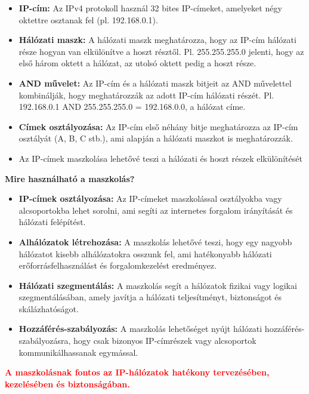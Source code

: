 \documentclass[11pt,a4paper]{article}
\begin{document}
            \begin{tcolorbox}[colback=blue!5!white,colframe=blue!50!black,title= 42. Ismertesse az internetes címek maszkolási algoritmusát!]
                \begin{itemize}
                    \item \textbf{IP-cím:} Az IPv4 protokoll használ 32 bites IP-címeket, amelyeket négy oktettre osztanak fel (pl. 192.168.0.1).
                    \item \textbf{Hálózati maszk:} A hálózati maszk meghatározza, hogy az IP-cím hálózati része hogyan van elkülönítve a hoszt résztől. Pl. 255.255.255.0 jelenti, hogy az első három oktett a hálózat, az utolsó oktett pedig a hoszt része.
                    \item \textbf{AND művelet:} Az IP-cím és a hálózati maszk bitjeit az AND művelettel kombinálják, hogy meghatározzák az adott IP-cím hálózati részét. Pl. 192.168.0.1 AND 255.255.255.0 = 192.168.0.0, a hálózat címe.
                    \item \textbf{Címek osztályozása:} Az IP-cím első néhány bitje meghatározza az IP-cím osztályát (A, B, C stb.), ami alapján a hálózati maszkot is meghatározzák.
                    \item Az IP-címek maszkolása lehetővé teszi a hálózati és hoszt részek elkülönítését 
                \end{itemize}    
                \textbf{Mire használható a maszkolás?}
                \begin{itemize}
                    \item \textbf{IP-címek osztályozása:} Az IP-címeket maszkolással osztályokba vagy alcsoportokba lehet sorolni, ami segíti az internetes forgalom irányítását és hálózati felépítést.
                    \item \textbf{Alhálózatok létrehozása:} A maszkolás lehetővé teszi, hogy egy nagyobb hálózatot kisebb alhálózatokra osszunk fel, ami hatékonyabb hálózati erőforrásfelhasználást és forgalomkezelést eredményez.
                    \item \textbf{Hálózati szegmentálás:} A maszkolás segít a hálózatok fizikai vagy logikai szegmentálásában, amely javítja a hálózati teljesítményt, biztonságot és skálázhatóságot.
                    \item \textbf{Hozzáférés-szabályozás:} A maszkolás lehetőséget nyújt hálózati hozzáférés-szabályozásra, hogy csak bizonyos IP-címrészek vagy alcsoportok kommunikálhassanak egymással.
                \end{itemize}
                \textcolor{red}{\textbf{A maszkolásnak fontos az IP-hálózatok hatékony tervezésében, kezelésében és biztonságában.}}
            \end{tcolorbox}
            
\end{document}
